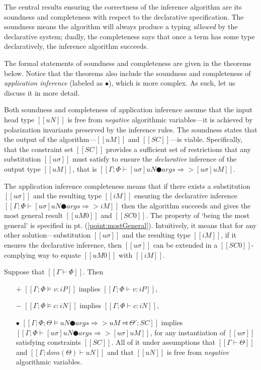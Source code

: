 \label{sec:proofs}
The central results ensuring the correctness of the inference algorithm are its
soundness and completeness with respect to the declarative specification. The
soundness means the algorithm will always produce a typing \emph{allowed} by the
declarative system; dually, the completeness says that once a term has some type
declaratively, the inference algorithm succeeds. 

The formal statements of soundness and completeness are given in the theorems
below. Notice that the theorems also include the soundness and completeness of
\emph{application inference} (labeled as $\bullet$), which is more complex. As
such, let us discuss it in more detail.

Both soundness and completeness of application inference assume that the input
head type $[[uN]]$ is free from \emph{negative} algorithmic variables---it is
achieved by polarization invariants preserved by the inference rules. The
soundness states that the output of the algorithm---$[[uM]]$ and $[[SC]]$---is
viable. Specifically, that the constraint set $[[SC]]$ provides a sufficient set
of restrictions that any substitution $[[uσ]]$ must satisfy to ensure the
\emph{declarative} inference of the output type $[[uM]]$, that is 
$[[ Γ ; Φ ⊢ [uσ]uN ● args ⇒> [uσ]uM ]]$.

The application inference completeness means that if there exists a substitution
$[[uσ]]$ and the resulting type $[[iM]]$ ensuring the declarative inference
$[[Γ; Φ ⊢ [uσ]uN ● args ⇒> iM]]$ then the algorithm succeeds and gives the most
general result $[[uM0]]$ and $[[SC0]]$. The property of `being the most general'
is specified in pt. (\ref{point:mostGeneral}). Intuitively, it means that for
any other solution---substitution $[[uσ]]$ and the resulting type $[[iM]]$, if
it ensures the declarative inference, then $[[uσ]]$ can be extended in a
$[[SC0]]$-complying way to equate $[[uM0]]$ with $[[iM]]$.


\begin{theorem*}
    \label{thm:soundness-typing}
    Suppose that $[[Γ ⊢ Φ]]$. Then\footnotemark[1]
    \hfill
    \begin{itemize}
        \item [$+$] $[[Γ; Φ ⊨ v : iP]]$ implies $[[Γ; Φ ⊢ v : iP]]$,
        \item [$-$] $[[Γ; Φ ⊨ c : iN]]$ implies $[[Γ; Φ ⊢ c : iN]]$,
        \item [$\bullet$] $[[Γ; Φ; Θ ⊨ uN ● args ⇒> uM ⫤ Θ'; SC]]$ implies $[[ Γ ; Φ ⊢ [uσ]uN ● args ⇒> [uσ]uM ]]$, 
            for any instantiation of $[[uσ]]$ satisfying constraints $[[SC]]$.
            All of it under assumptions that $[[Γ ⊢ Θ]]$ and $[[Γ; dom(Θ) ⊢ uN]]$ and that $[[uN]]$ is free from 
            \emph{negative} algorithmic variables.
    \end{itemize}
\end{theorem*}

